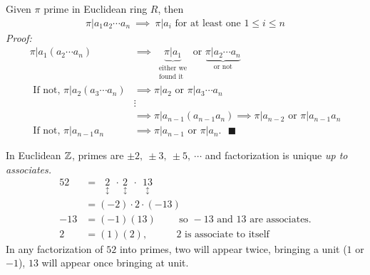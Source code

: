 \begin{corollary}
    Given $\pi$ prime in Euclidean ring $R$, then
    \begin{align*}
        \pi | a_1 a_2 \cdots a_n \ \implies \ \pi | a_i \text{ for at least one } 1\leq i \leq n
    \end{align*}
    \textit{Proof: }
    \begin{align*}
        \pi | a_1 (a_2 \cdots a_n) \ &\implies \ \underbrace{\pi |a_1}_{\substack{\text{either we}\\ \text{found it}}} \text{ or  } \underbrace{\pi | a_2 \cdots a_n}_{\text{or not}}\\
        \text{ If not, }\pi | a_2 (a_3 \cdots a_n) &\implies \pi | a_2 \text{ or }\pi | a_3 \cdots a_n \\
        &\vdots \\
        &\implies \pi |a_{n-1}(a_{n-1}a_n) \implies \pi|a_{n-2} \text{ or }\pi | a_{n-1}a_n \\
        \text{ If not, } \pi |a_{n-1}a_n &\implies \pi | a_{n-1} \text{ or }\pi | a_n. \ \ \ \blacksquare
    \end{align*}
\end{corollary}

In Euclidean ${\mathbb{Z}}$, primes are $\pm 2, \ \pm 3, \ \pm 5, \ \cdots $ and factorization is unique
\textit{up to associates.}
\begin{align*}
    52&= \ \ \ \underset{\updownarrow}{2} \ \ \cdot \ \underset{\updownarrow}{2} \ \ \cdot \ \ \underset{\updownarrow}{13} \\
    &= (-2)\cdot 2 \cdot (-13) \\
    -13&= (-1)(13) \ \ \ \ \ \ \ \ \ \text{ so }-13 \text{ and }13 \text{ are associates.} \\
    2&=(1)(2), \ \ \ \ \ \ \ \ \ \ \ \ \ 2 \text{ is associate to itself}
\end{align*}
In any factorization of $52$ into primes, two will appear twice, bringing a unit ($1$ or $-1$), $13$
will appear once bringing at unit. \\ \steezybreak

